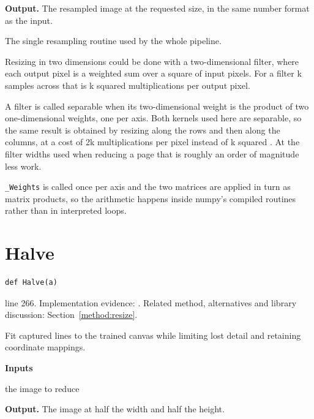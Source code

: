 \noindent\textbf{Output.} The resampled image at the requested size, in the same number format as the input.


The single resampling routine used by the whole pipeline.


Resizing in two dimensions could be done with a two-dimensional filter, where each output pixel is a weighted sum over a square of input pixels. For a filter k samples across that is k squared multiplications per output pixel.

A filter is called separable when its two-dimensional weight is the product of two one-dimensional weights, one per axis. Both kernels used here are separable, so the same result is obtained by resizing along the rows and then along the columns, at a cost of 2k multiplications per pixel instead of k squared \cite{wolberg1990}. At the filter widths used when reducing a page that is roughly an order of magnitude less work.


\texttt{\_Weights} is called once per axis and the two matrices are applied in turn as matrix products, so the arithmetic happens inside numpy's compiled routines rather than in interpreted loops.



\section{Halve}\label{fn:segment:Halve}
\begin{lstlisting}[style=sig]
def Halve(a)
\end{lstlisting}
 line 266. Implementation evidence: \cite{code2026}. Related method, alternatives and library discussion: Section~\ref{method:resize}.


Fit captured lines to the trained canvas while limiting lost detail and retaining coordinate mappings.




\noindent\textbf{Inputs}
\begin{description}[leftmargin=2.2em,style=nextline,font=\normalfont\ttfamily]\setlength\itemsep{1pt}
  \item[{img}] \normalfont the image to reduce
\end{description}

\noindent\textbf{Output.} The image at half the width and half the height.



